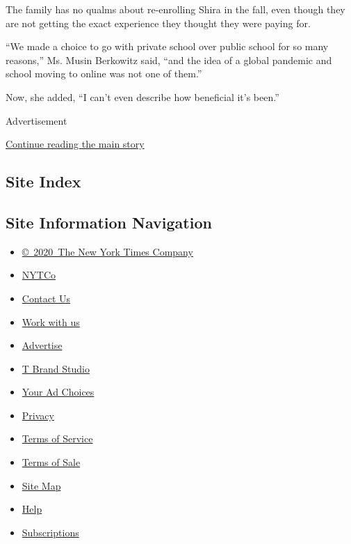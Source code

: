 The family has no qualms about re-enrolling Shira in the fall, even
though they are not getting the exact experience they thought they were
paying for.

``We made a choice to go with private school over public school for so
many reasons,'' Ms. Musin Berkowitz said, ``and the idea of a global
pandemic and school moving to online was not one of them.''

Now, she added, ``I can't even describe how beneficial it's been.''

Advertisement

\protect\hyperlink{after-bottom}{Continue reading the main story}

\hypertarget{site-index}{%
\subsection{Site Index}\label{site-index}}

\hypertarget{site-information-navigation}{%
\subsection{Site Information
Navigation}\label{site-information-navigation}}

\begin{itemize}
\tightlist
\item
  \href{https://help.nytimes3xbfgragh.onion/hc/en-us/articles/115014792127-Copyright-notice}{©~2020~The
  New York Times Company}
\end{itemize}

\begin{itemize}
\tightlist
\item
  \href{https://www.nytco.com/}{NYTCo}
\item
  \href{https://help.nytimes3xbfgragh.onion/hc/en-us/articles/115015385887-Contact-Us}{Contact
  Us}
\item
  \href{https://www.nytco.com/careers/}{Work with us}
\item
  \href{https://nytmediakit.com/}{Advertise}
\item
  \href{http://www.tbrandstudio.com/}{T Brand Studio}
\item
  \href{https://www.nytimes3xbfgragh.onion/privacy/cookie-policy\#how-do-i-manage-trackers}{Your
  Ad Choices}
\item
  \href{https://www.nytimes3xbfgragh.onion/privacy}{Privacy}
\item
  \href{https://help.nytimes3xbfgragh.onion/hc/en-us/articles/115014893428-Terms-of-service}{Terms
  of Service}
\item
  \href{https://help.nytimes3xbfgragh.onion/hc/en-us/articles/115014893968-Terms-of-sale}{Terms
  of Sale}
\item
  \href{https://spiderbites.nytimes3xbfgragh.onion}{Site Map}
\item
  \href{https://help.nytimes3xbfgragh.onion/hc/en-us}{Help}
\item
  \href{https://www.nytimes3xbfgragh.onion/subscription?campaignId=37WXW}{Subscriptions}
\end{itemize}
